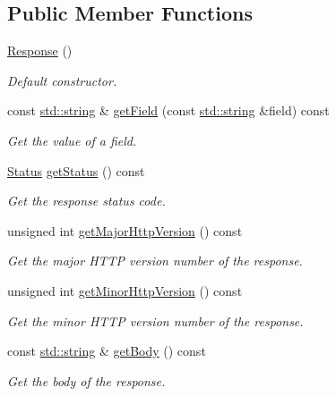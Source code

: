 \subsection*{Public Member Functions}
\begin{DoxyCompactItemize}
\item 
\hyperlink{classsf_1_1_http_1_1_response_a2e51c89356fe6a007c448a841a9ec08c}{Response} ()
\begin{DoxyCompactList}\small\item\em Default constructor. \end{DoxyCompactList}\item 
const \hyperlink{gl3_8h_ac83513893df92266f79a515488701770}{std\-::string} \& \hyperlink{classsf_1_1_http_1_1_response_a25d7cf86538a1045d31e0b601090b8f0}{get\-Field} (const \hyperlink{gl3_8h_ac83513893df92266f79a515488701770}{std\-::string} \&field) const 
\begin{DoxyCompactList}\small\item\em Get the value of a field. \end{DoxyCompactList}\item 
\hyperlink{classsf_1_1_http_1_1_response_a663e071978e30fbbeb20ed045be874d8}{Status} \hyperlink{classsf_1_1_http_1_1_response_a542e9856b1dd260a83940eb982b7f19a}{get\-Status} () const 
\begin{DoxyCompactList}\small\item\em Get the response status code. \end{DoxyCompactList}\item 
unsigned int \hyperlink{classsf_1_1_http_1_1_response_a3da9c689318b945dd12cbe7167161dc6}{get\-Major\-Http\-Version} () const 
\begin{DoxyCompactList}\small\item\em Get the major H\-T\-T\-P version number of the response. \end{DoxyCompactList}\item 
unsigned int \hyperlink{classsf_1_1_http_1_1_response_a1c2217a6a848695875380a70d060b239}{get\-Minor\-Http\-Version} () const 
\begin{DoxyCompactList}\small\item\em Get the minor H\-T\-T\-P version number of the response. \end{DoxyCompactList}\item 
const \hyperlink{gl3_8h_ac83513893df92266f79a515488701770}{std\-::string} \& \hyperlink{classsf_1_1_http_1_1_response_a6b74ef73051a16ebb20041495c758e22}{get\-Body} () const 
\begin{DoxyCompactList}\small\item\em Get the body of the response. \end{DoxyCompactList}\end{DoxyCompactItemize}
